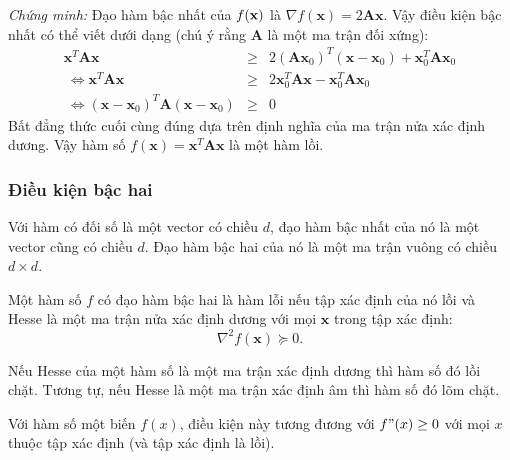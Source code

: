 \textit{Chứng minh:} Đạo hàm bậc nhất của $f(\mathbf{x})$ là
\begin{math}
\nabla f(\mathbf{x}) = 2\mathbf{A} \mathbf{x}
\end{math}.
Vậy điều kiện bậc nhất có thể viết dưới dạng (chú ý rằng $\mathbf{A}$ là một ma trận đối xứng):
\begin{eqnarray*}
\mathbf{x}^T\mathbf{Ax} &\geq& 2(\mathbf{A}\mathbf{x}_0)^T (\mathbf{x} - \mathbf{x}_0) + \mathbf{x}_0^T\mathbf{A}\mathbf{x}_0 \\\
\Leftrightarrow \mathbf{x}^T\mathbf{Ax} &\geq& 2\mathbf{x}_0^T\mathbf{A}\mathbf{x} -\mathbf{x}_0^T\mathbf{A}\mathbf{x}_0  \\\
\Leftrightarrow (\mathbf{x} - \mathbf{x}_0)^T\mathbf{A}(\mathbf{x} - \mathbf{x}_0) &\geq& 0
\end{eqnarray*}
Bất đẳng thức cuối cùng đúng dựa trên định nghĩa của ma trận {nửa xác
định dương}. Vậy hàm số $f(\mathbf{x}) = \mathbf{x}^T\mathbf{A}\mathbf{x}$ là
một {hàm lồi}. \dpcm


\subsubsection{Điều kiện bậc hai}
\index{Hesse -- Hessian}
Với hàm có đối số là một vector có chiều $d$, đạo hàm bậc
nhất của nó là một vector cũng có chiều $d$. Đạo hàm bậc hai của nó là một ma
trận vuông có chiều $d\times d$.

 {Một hàm số $f$ có đạo hàm bậc hai là hàm lỗi nếu tập xác định của nó lồi và Hesse là một ma trận {nửa xác định dương} với mọi $\mathbf{x}$ trong tập xác định:
\begin{equation*}
\nabla^2 f(\mathbf{x}) \succeq 0.
\end{equation*}
}


Nếu Hesse của một hàm số là một ma trận {xác định dương} thì hàm số đó
lồi chặt. Tương tự, nếu Hesse là một ma trận {xác
định âm} thì hàm số đó lõm chặt.

Với hàm số một biến $f(x)$, điều kiện này tương đương với $f"(x) \geq 0$ với mọi
$x$ thuộc tập xác định (và tập xác định là lồi).

